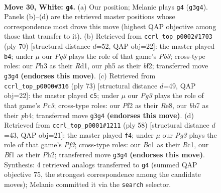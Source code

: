 \documentclass[11pt]{article}
\begin{document}
\clearpage

\begin{figure}[p]\centering
\begin{subfigure}{0.46\textwidth}\centering
\resizebox{\linewidth}{!}{%
\newchessgame
\chessboard[
  setfen={1r1r4/pb1p1pk1/8/2R1p2p/8/5nPP/PP3P2/2BK1B1R w - - 1 30},
  showmover=false,
  pgfstyle=straightmove, color=movearrow, markmove={g3-g4}
]}
\caption{}
\end{subfigure}\hfill
\begin{subfigure}{0.46\textwidth}\centering
\resizebox{\linewidth}{!}{%
\newchessgame
\chessboard[
  setfen={3R4/5pk1/2r5/1pr4p/8/PP1Bp3/1P3bPP/1K1R4 w - - 8 36},
  showmover=false,
  pgfstyle=straightmove, color=movearrow, markmove={b3-b4}
]}
\caption{}
\end{subfigure}
\\[4pt]
\begin{subfigure}{0.46\textwidth}\centering
\resizebox{\linewidth}{!}{%
\newchessgame
\chessboard[
  setfen={4r3/1p2k3/2p1b2p/4rpp1/1P6/2NRP2P/5PPK/3R4 b - - 5 37},
  showmover=false,
  pgfstyle=straightmove, color=movearrow, markmove={c6-c5}
]}
\caption{}
\end{subfigure}\hfill
\begin{subfigure}{0.46\textwidth}\centering
\resizebox{\linewidth}{!}{%
\newchessgame
\chessboard[
  setfen={3r3r/pp1b2pp/5k2/5p2/1PP5/P1KBRP2/7P/2R5 w - - 1 30},
  showmover=false,
  pgfstyle=straightmove, color=movearrow, markmove={f3-f4}
]}
\caption{}
\end{subfigure}
\caption{\textbf{Move 30, White: \texttt{g4}.} (a) Our position; Melanie plays \texttt{g4} (\texttt{g3g4}). Panels (b)--(d) are the retrieved master positions whose correspondence most drove this move (highest QAP objective among those that transfer to it). (b) Retrieved from \texttt{ccrl\_top\_p0002\#1703} (ply 70) [structural distance $d$=52, QAP obj=22]: the master played \texttt{b4}; under $\mu$ our \emph{Pg3} plays the role of that game's \emph{Pb3}; cross-type roles: our \emph{P}h3 as their \emph{R}d1, our \emph{p}h5 as their \emph{b}f2; transferred move \texttt{g3g4} \textbf{(endorses this move)}. (c) Retrieved from \texttt{ccrl\_top\_p0000\#316} (ply 73) [structural distance $d$=49, QAP obj=22]: the master played \texttt{c5}; under $\mu$ our \emph{Pg3} plays the role of that game's \emph{Pc3}; cross-type roles: our \emph{P}f2 as their \emph{R}e8, our \emph{b}b7 as their \emph{p}b4; transferred move \texttt{g3g4} \textbf{(endorses this move)}. (d) Retrieved from \texttt{ccrl\_top\_p0001\#1211} (ply 58) [structural distance $d$=43, QAP obj=21]: the master played \texttt{f4}; under $\mu$ our \emph{Pg3} plays the role of that game's \emph{Pf3}; cross-type roles: our \emph{B}c1 as their \emph{R}c1, our \emph{B}f1 as their \emph{P}h2; transferred move \texttt{g3g4} \textbf{(endorses this move)}. Synthesis: 4 retrieved analogs transferred to \texttt{g4} (summed QAP objective 75, the strongest correspondence among the candidate moves); Melanie committed it via the \texttt{search} selector.}
\label{fig:thought-m58}
\end{figure}
\end{document}

